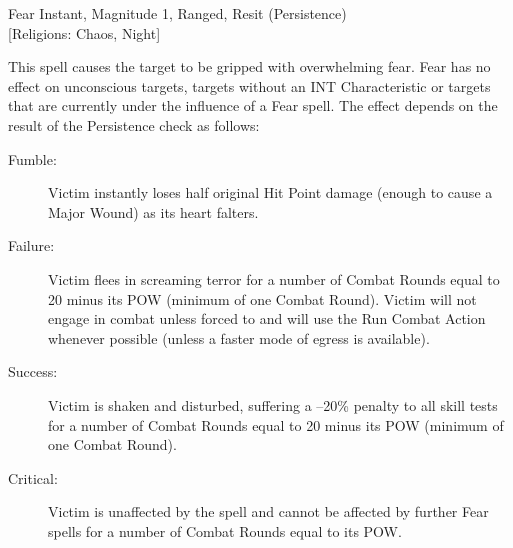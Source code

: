 \begin{rpg-spell}
{Fear}
{Instant, Magnitude 1, Ranged, Resit (Persistence)\\{[Religions: Chaos, Night]}}

This spell causes the target to be gripped with overwhelming fear. Fear has no effect on unconscious targets, targets without an INT Characteristic or targets that are currently under the influence of a Fear spell. The effect depends on the result of the Persistence check as follows:
\begin{description}
\item[Fumble:] Victim instantly loses half original Hit Point damage (enough to cause a Major Wound) as its heart falters. 
\item[Failure:] Victim flees in screaming terror for a number of Combat Rounds equal to 20 minus its POW (minimum of one Combat Round). Victim will not engage in combat unless forced to and will use the Run Combat Action whenever possible (unless a faster mode of egress is available). 
\item[Success:] Victim is shaken and disturbed, suffering a –20\% penalty to all skill tests for a number of Combat Rounds equal to 20 minus its POW (minimum of one Combat Round).
\item[Critical:] Victim is unaffected by the spell and cannot be affected by further Fear spells for a number of Combat Rounds equal to its POW.
\end{description}
\end{rpg-spell}

